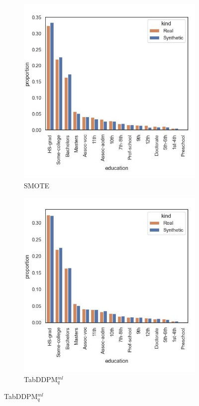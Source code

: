 \begin{figure}[H]
	\begin{subfigure}{0.3\textwidth}
		\centering
		\includegraphics[width=\textwidth]{images/dist_education/SMOTE.jpg}
		\caption{SMOTE}
	\end{subfigure}
	\begin{subfigure}{0.3\textwidth}
		\centering
		\includegraphics[width=\textwidth]{images/dist_education/tab-ddpm.jpg}
		\caption{TabDDPM$^{ml}_q$}
	\end{subfigure}  



\end{figure}
